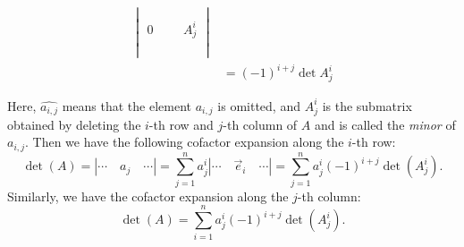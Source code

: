 \begin{align*}
\begin{vmatrix}
                                                                                                                                                     \\ \\
                                                                                                                                                     0 &         &        & A^i_j                                \\
                                                                                                                                                     \\ \\
                                                                                                                                                   \end{vmatrix} \\
                                                                                                                        & = {(-1)}^{i + j} \det A^i_j
\end{align*}
Here, $\widehat{a_{i,j}}$ means that the element $a_{i,j}$ is omitted, and $A^i_j$ is the submatrix obtained by deleting the $i$-th row and $j$-th column of $A$ and is called the \emph{minor} of $a_{i,j}$. Then we have the following cofactor expansion along the $i$-th row:
\[
  \det(A) = | \cdots \quad a_j \quad \cdots | = \sum_{j=1}^n a^i_j | \cdots \quad \vec{e}_i \quad \cdots | = \sum_{j=1}^n a^i_j {(-1)}^{i + j} \det(A^i_j).
\]
Similarly, we have the cofactor expansion along the $j$-th column:
\[
  \det(A) = \sum_{i=1}^n a^i_j {(-1)}^{i + j} \det(A^i_j).
\]

